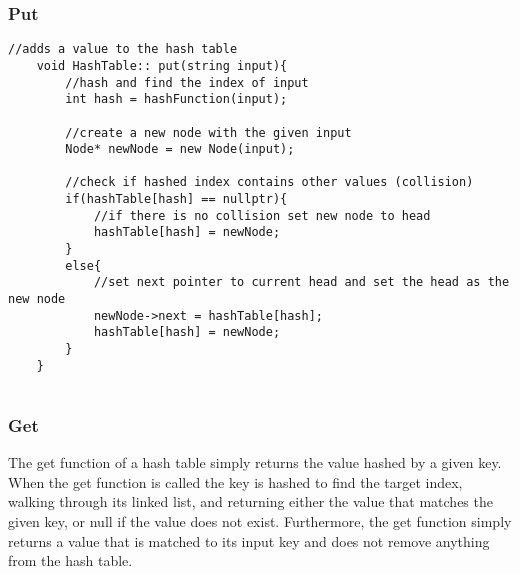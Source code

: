 \documentclass[letterpaper, 10pt,DIV=13]{scrartcl}
\numberwithin{equation}{section} %
\numberwithin{figure}{section} %
\numberwithin{table}{section} %
\begin{document}
\subsubsection*{Put}
    \lstset{numbers=left, numberstyle=\tiny, stepnumber=1, numbersep=5pt, basicstyle=\footnotesize\ttfamily}
    \begin{lstlisting}[frame=single, ]
    //adds a value to the hash table
    void HashTable:: put(string input){
        //hash and find the index of input
        int hash = hashFunction(input);
    
        //create a new node with the given input
        Node* newNode = new Node(input);
    
        //check if hashed index contains other values (collision)
        if(hashTable[hash] == nullptr){ 
            //if there is no collision set new node to head
            hashTable[hash] = newNode;
        }
        else{ 
            //set next pointer to current head and set the head as the new node
            newNode->next = hashTable[hash];
            hashTable[hash] = newNode;
        }
    }
    
\end{lstlisting}

\pagebreak

\subsubsection{Get}
The get function of a hash table simply returns the value hashed by a given key. When the get function is called the key is hashed to find the target index, walking through its linked list, and returning either the value that matches the given key, or null if the value does not exist. Furthermore, the get function simply returns a value that is matched to its input key and does not remove anything from the hash table.
\end{document}

